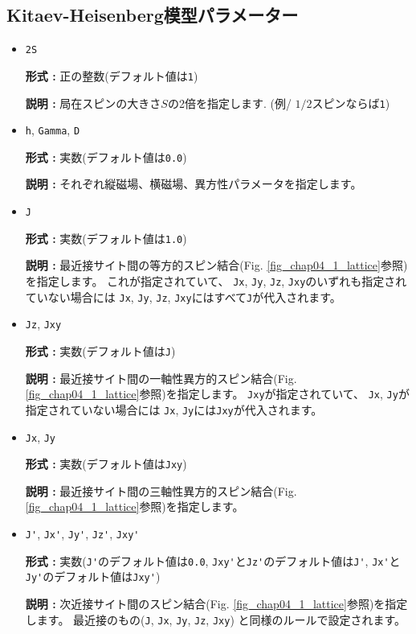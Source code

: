 \subsection{Kitaev-Heisenberg模型パラメーター}
\begin{itemize}
\item \verb|2S|

{\bf 形式 :} 正の整数(デフォルト値は\verb|1|)

{\bf 説明 :} 局在スピンの大きさ$S$の2倍を指定します.
(例/ $1/2$スピンならば\verb|1|)

\item \verb|h|, \verb|Gamma|, \verb|D|

{\bf 形式 :} 実数(デフォルト値は\verb|0.0|)

{\bf 説明 :} それぞれ縦磁場、横磁場、異方性パラメータを指定します。

\item \verb|J|

{\bf 形式 :} 実数(デフォルト値は\verb|1.0|)

{\bf 説明 :} 最近接サイト間の等方的スピン結合(Fig. \ref{fig_chap04_1_lattice}参照)を指定します。
これが指定されていて、
\verb|Jx|, \verb|Jy|, \verb|Jz|, \verb|Jxy|のいずれも指定されていない場合には
\verb|Jx|, \verb|Jy|, \verb|Jz|, \verb|Jxy|にはすべて\verb|J|が代入されます。

\item \verb|Jz|, \verb|Jxy|

{\bf 形式 :} 実数(デフォルト値は\verb|J|)

{\bf 説明 :} 最近接サイト間の一軸性異方的スピン結合(Fig. \ref{fig_chap04_1_lattice}参照)を指定します。
\verb|Jxy|が指定されていて、
\verb|Jx|, \verb|Jy|が指定されていない場合には
\verb|Jx|, \verb|Jy|には\verb|Jxy|が代入されます。

\item \verb|Jx|, \verb|Jy|

{\bf 形式 :} 実数(デフォルト値は\verb|Jxy|)

{\bf 説明 :} 最近接サイト間の三軸性異方的スピン結合(Fig. \ref{fig_chap04_1_lattice}参照)を指定します。

\item \verb|J'|, \verb|Jx'|, \verb|Jy'|, \verb|Jz'|, \verb|Jxy'|

{\bf 形式 :} 実数(\verb|J'|のデフォルト値は\verb|0.0|, 
\verb|Jxy'|と\verb|Jz'|のデフォルト値は\verb|J'|,
\verb|Jx'|と\verb|Jy'|のデフォルト値は\verb|Jxy'|)

{\bf 説明 :} 次近接サイト間のスピン結合(Fig. \ref{fig_chap04_1_lattice}参照)を指定します。
最近接のもの(\verb|J|, \verb|Jx|, \verb|Jy|, \verb|Jz|, \verb|Jxy|)
と同様のルールで設定されます。


\end{itemize}
